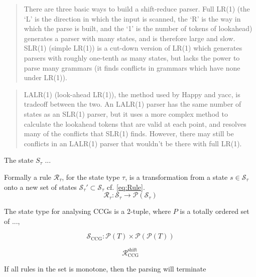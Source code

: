 \begin{quote}
	There are three basic ways to build a shift-reduce parser. Full LR(1) (the `L' is the direction in which the input is scanned, the `R' is the way in which the parse is built, and the `1' is the number of tokens of lookahead) generates a parser with many states, and is therefore large and slow. SLR(1) (simple LR(1)) is a cut-down version of LR(1) which generates parsers with roughly one-tenth as many states, but lacks the power to parse many grammars (it finds conflicts in grammars which have none under LR(1)).
\end{quote}

\begin{quote}
LALR(1) (look-ahead LR(1)), the method used by Happy and yacc, is tradeoff between the two. An LALR(1) parser has the same number of states as an SLR(1) parser, but it uses a more complex method to calculate the lookahead tokens that are valid at each point, and resolves many of the conflicts that SLR(1) finds. However, there may still be conflicts in an LALR(1) parser that wouldn't be there with full LR(1).
\end{quote}

The state $S_\tau$ ...

Formally a rule $\mathcal{R}_\tau$, for the state type $\tau$, is a transformation from a state $s \in \mathcal{S}_\tau$ onto a new set of states $\mathcal{S}_\tau' \subset \mathcal{S}_\tau$ cf. \ref{eq:Rule}.
\begin{equation}
	\mathcal{R}_\tau : \mathcal{S}_\tau \to \mathcal{P}(\mathcal{S}_\tau)
	\label{eq:Rule}
\end{equation} 

The state type for analysing CCGs is a 2-tuple, where $P$ is  a totally ordered set of ..., 

$$\mathcal{S}_\mathrm{CCG} : \mathcal{P}(T) \times \mathcal{P}(\mathcal{P}(T))$$

\begin{equation}
	\mathcal{R}^\mathrm{shift}_\mathrm{CCG}
\end{equation}

If all rules in the set is monotone, then the parsing will terminate 

